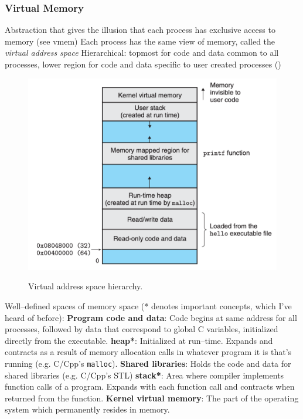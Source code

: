 \documentclass[../bryant_comp_sys.tex]{subfiles}
\begin{document}
        \subsubsection{Virtual Memory}
            \begin{outline}
                \1 Abstraction that gives the illusion that each process has exclusive access to memory (see \gls{vmem})
                \1 Each process has the same view of memory, called the \textit{virtual address space}
                \1 Hierarchical: topmost for code and data common to all processes, lower region for code and data specific to user created processes ()

                \begin{figure}
                    \centering
                    \includegraphics[width=0.5\linewidth]{ch1/figs/virtual_memory_hierarchy.png}
                    \label{fig:virtual_address_hierarchy}
                    \caption{Virtual address space hierarchy.}
                \end{figure}

                \1 Well--defined spaces of memory space (* denotes important concepts, which I've heard of before):
                    \2 \textbf{Program code and data}: Code begins at same address for all processes, followed by data that correspond to global C variables, initialized directly from the executable.
                    \2 \textbf{\Gls{heap}*}: Initialized at run--time. Expands and contracts as a result of memory allocation calls in whatever program it is that's running (e.g. C/Cpp's \texttt{malloc}).
                    \2 \textbf{Shared libraries}: Holds the code and data for shared libraries (e.g. C/Cpp's STL)
                    \2 \textbf{\Gls{stack}*}: Area where compiler implements function calls of a program. Expands with each function call and contracts when returned from the function.
                    \2 \textbf{Kernel virtual memory}: The part of the operating system which permanently resides in memory.
            \end{outline}
\end{document}
